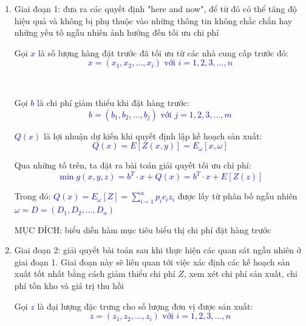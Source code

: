 \documentclass[a4paper]{article}
\begin{document}
    \begin{enumerate}
        \item Giai đoạn 1: đưa ra các quyết định "here and now", để từ đó có thể tăng độ hiệu quả và không bị phụ thuộc vào những thông tin không chắc chắn hay những yếu tố ngẫu nhiên ảnh hưởng đến tối ưu chi phí \\
    

\begin{minipage}{0.8\textwidth}
    \setlength{\parindent}{20pt}   
    Gọi \textcolor{blue}{$x$} là số lượng hàng đặt trước đã tối ưu từ các nhà cung cấp trước đó:
   \textcolor{blue}{ \[ x = (x_1, x_2, \ldots, x_{i}) \text{ với } i = 1,2,3, \ldots, n \]}
 \end{minipage}   \\
\begin{minipage}{0.8\textwidth}  
    \setlength{\parindent}{20pt}   
    Gọi \textcolor{blue}{$b$} là chi phí giảm thiểu khi đặt hàng trước:
   \textcolor{blue}{ \[ b = (b_1, b_2, \ldots, b_{j}) \text{ với } j = 1,2,3, \ldots, m \]}
    
    \textcolor{blue}{$Q(x)$} là lợi nhuận dự kiến khi quyết định lập kế hoạch sản xuất:
    \textcolor{blue}{\[ Q(x) = E[Z(x,y)] = E_{\omega}[x, \omega] \]}
    
    Qua những tố trên, ta đặt ra bài toán giải quyết tối ưu chi phí:
    \textcolor{blue}{\[ \min g(x,y,z) = b^T \cdot x  + Q(x) = b^T \cdot x + E[Z(z)] \]}
    
    \begin{minipage}{\textwidth}
        \setlength{\parindent}{20pt}
        Trong đó: \textcolor{blue}{$Q(x) = E_{\omega}[Z] = \sum_{i=1}^{n} p_i c_i z_i$} được lấy từ phân bố ngẫu nhiên \textcolor{blue}{$\omega = D = (D_1, D_2, \ldots, D_n)$}
    \end{minipage}
\end{minipage}

MỤC ĐÍCH:  biểu diễn hàm mục tiêu biểu thị chi phí đặt hàng trước
\item Giai đoạn 2: giải quyết bài toán sau khi thực hiện các quan sát ngẫu nhiên ở giai đoạn 1. Giai đoạn này sẽ liên quan tới việc xác định các kế hoạch sản xuất tốt nhất bằng cách giảm thiểu chi phí $Z$, xem xét chi phí sản xuất, chi phí tồn kho và giá trị thu hồi

\begin{minipage}{0.8\textwidth}
    \setlength{\parindent}{20pt}
    Gọi \textcolor{blue}{$z$} là đại lượng đặc trưng cho số lượng đơn vị được sản xuất:
    \textcolor{blue}{\[z = (z_1, z_2, \ldots, z_i) \text{ với } i = 1,2,3, \ldots, n \]}


\end{minipage}
\end{enumerate}
\end{document}
